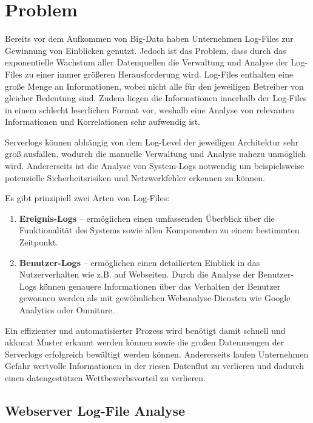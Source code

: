 \chapter{Problem}
\label{cha:Problem}

Bereits vor dem Aufkommen von Big-Data haben Unternehmen Log-Files zur Gewinnung von Einblicken genutzt. Jedoch ist das Problem, dass durch das exponentielle Wachstum aller Datenquellen die Verwaltung und Analyse der Log-Files zu einer immer größeren Herausforderung wird. Log-Files enthalten eine große Menge an Informationen, wobei nicht alle für den jeweiligen Betreiber von gleicher Bedeutung sind. Zudem liegen die Informationen innerhalb der Log-Files in einem schlecht leserlichen Format vor, weshalb eine Analyse von relevanten Informationen und Korrelationen sehr aufwendig ist.

Serverlogs können abhängig von dem Log-Level der jeweiligen Architektur sehr groß ausfallen, wodurch die manuelle Verwaltung und Analyse nahezu unmöglich wird. Andererseits ist die Analyse von System-Logs notwendig um beispielsweise potenzielle Sicherheitsrisiken und Netzwerkfehler erkennen zu können.

Es gibt prinzipiell zwei Arten von Log-Files:

\begin{enumerate}
\item \textbf{Ereignis-Logs} -- ermöglichen einen umfassenden Überblick über die Funktionalität des Systems sowie allen Komponenten zu einem bestimmten Zeitpunkt.
\item \textbf{Benutzer-Logs} -- ermöglichen einen detailierten Einblick in das Nutzerverhalten wie z.B. auf Webseiten. Durch die Analyse der Benutzer-Logs können genauere Informationen über das Verhalten der Benutzer gewonnen werden als mit gewöhnlichen Webanalyse-Diensten wie Google Analytics oder Omniture.
\end{enumerate}

Ein effizienter und automatisierter Prozess wird benötigt damit schnell und akkurat Muster erkannt werden können sowie die großen Datenmengen der Serverlogs erfolgreich bewältigt werden können. Andererseits laufen Unternehmen Gefahr wertvolle Informationen in der riesen Datenflut zu verlieren und dadurch einen datengestützen Wettbewerbsvorteil zu verlieren.

\pagebreak

\section{Webserver Log-File Analyse}
\label{sec:WebserverLogs}

